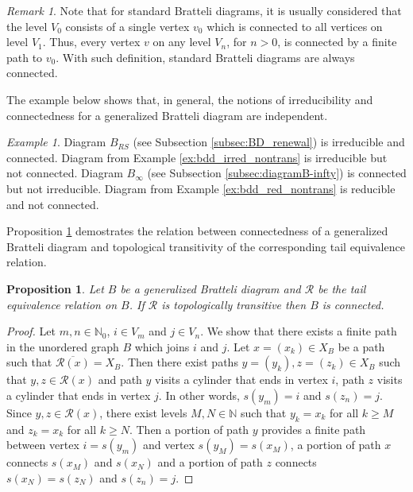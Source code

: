 \documentclass[11pt, twoside]{amsart}
\theoremstyle{definition}
\theoremstyle{remark}
\newtheorem{example}[definition]{Example}
\newtheorem{remark}[definition]{Remark}
\theoremstyle{plain}
\newtheorem{prop}[definition]{Proposition}
\newcommand{\tcr}{\textcolor{red}}
\def\ov{\overline}
\numberwithin{equation}{section}
\begin{document}
\begin{remark}
    Note that for standard Bratteli diagrams, it is usually considered that the level $V_0$ consists of a single vertex $v_0$ which is connected to all vertices on level $V_1$. Thus, every vertex $v$ on any level $V_n$, for $n > 0$, is connected by a finite path to $v_0$. With such definition, standard Bratteli diagrams
    are always connected.
\end{remark}

The example below shows that, in general, the notions of irreducibility and connectedness for a generalized Bratteli diagram are independent. 

\begin{example} Diagram $B_{RS}$ (see Subsection \ref{subsec:BD_renewal}) is irreducible and connected. Diagram from Example \ref{ex:bdd_irred_nontrans} is irreducible but not connected. Diagram $B_{\infty}$ (see Subsection \ref{subsec:diagramB-infty}) is connected but not irreducible. Diagram from Example \ref{ex:bdd_red_nontrans} is reducible and not connected.
\end{example}


Proposition \ref{prop:Rconnect} demostrates the relation between connectedness of a generalized Bratteli diagram and topological transitivity of the corresponding tail equivalence relation.

\begin{prop}\label{prop:Rconnect}
    Let $B$ be a generalized Bratteli diagram and $\mathcal{R}$ be the tail equivalence relation on $B$. If $\mathcal{R}$ is topologically transitive then $B$ is connected.
\end{prop}

\begin{proof}
    Let $m,n \in \mathbb{N}_0$, $i \in V_m$ and $j \in V_n$. We show that there exists a finite path in the unordered graph $B$ which joins $i$ and $j$. Let $x = (x_k) \in X_B$ be a path such that $\ov{\mathcal{R}(x)} = X_B$. Then there exist paths $y  = (y_k), z  = (z_k) \in X_B$ such that $y, z \in \mathcal{R}(x)$ and path $y$ visits a cylinder that ends in vertex $i$, path $z$ visits a cylinder that ends in vertex $j$. In other words, $s(y_m) = i$ and $s(z_n) = j$. Since $y, z \in \mathcal{R}(x)$, there exist levels $M, N \in \mathbb{N}$ such that $y_k = x_k$ for all $k \geq M$ and $z_k = x_k$ for all $k \geq N$. Then a portion of path $y$ provides a finite path between vertex $i = s(y_m)$ and vertex $s(y_M) = s(x_M)$, a portion of path $x$ connects $s(x_M)$ and $s(x_N)$ and a portion of path $z$ connects $s(x_N) = s(z_N)$ and $s(z_n) = j$.
\end{proof}
\end{document}
